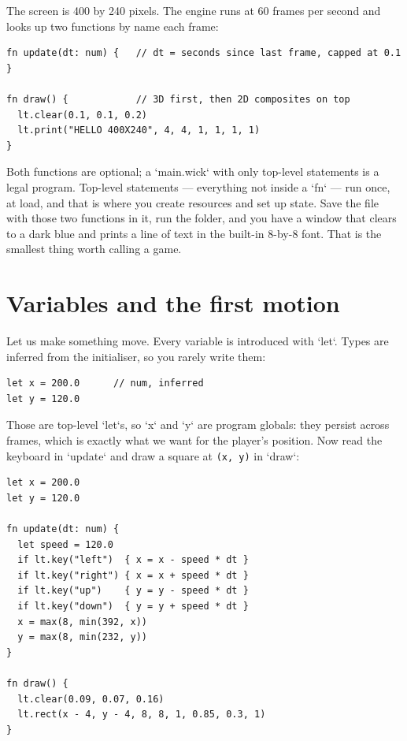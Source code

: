\noindent
The screen is 400 by 240 pixels. The engine runs at 60 frames per second and
looks up two functions by name each frame:

\begin{lstlisting}[language=wick]
fn update(dt: num) {   // dt = seconds since last frame, capped at 0.1
}

fn draw() {            // 3D first, then 2D composites on top
  lt.clear(0.1, 0.1, 0.2)
  lt.print("HELLO 400X240", 4, 4, 1, 1, 1, 1)
}
\end{lstlisting}

\noindent
Both functions are optional; a `main.wick` with only top-level statements is
a legal program. Top-level statements --- everything not inside a `fn` --- run
once, at load, and that is where you create resources and set up state. Save
the file with those two functions in it, run the folder, and you have a
window that clears to a dark blue and prints a line of text in the built-in
8-by-8 font. That is the smallest thing worth calling a game.

\section{Variables and the first motion}

Let us make something move. Every variable is introduced with `let`. Types
are inferred from the initialiser, so you rarely write them:

\begin{lstlisting}[language=wick]
let x = 200.0      // num, inferred
let y = 120.0
\end{lstlisting}

\noindent
Those are top-level `let`s, so `x` and `y` are program globals: they persist
across frames, which is exactly what we want for the player's position. Now
read the keyboard in `update` and draw a square at \texttt{(x, y)} in `draw`:

\begin{lstlisting}[language=wick]
let x = 200.0
let y = 120.0

fn update(dt: num) {
  let speed = 120.0
  if lt.key("left")  { x = x - speed * dt }
  if lt.key("right") { x = x + speed * dt }
  if lt.key("up")    { y = y - speed * dt }
  if lt.key("down")  { y = y + speed * dt }
  x = max(8, min(392, x))
  y = max(8, min(232, y))
}

fn draw() {
  lt.clear(0.09, 0.07, 0.16)
  lt.rect(x - 4, y - 4, 8, 8, 1, 0.85, 0.3, 1)
}
\end{lstlisting}

